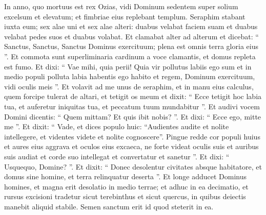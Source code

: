 \begin{biblechapter}
\begin{biblechapter}
\begin{biblechapter}
\begin{biblechapter}
\begin{biblechapter}
\begin{biblechapter}
\verse In anno, quo mortuus est rex Ozias, vidi Dominum sedentem super solium excelsum et elevatum; et fimbriae eius replebant templum. 
\verse Seraphim stabant iuxta eum; sex alae uni et sex alae alteri: duabus velabat faciem suam et duabus velabat pedes suos et duabus volabat. 
\verse Et clamabat alter ad alterum et dicebat:
 “ Sanctus, Sanctus, Sanctus Dominus exercituum;
 plena est omnis terra gloria eius ”.
 \verse Et commota sunt superliminaria cardinum a voce clamantis, et domus repleta est fumo.
 \verse Et dixi:
 “ Vae mihi, quia perii!
 Quia vir pollutus labiis ego sum
 et in medio populi polluta labia habentis ego habito
 et regem, Dominum exercituum, vidi oculis meis ”.
 \verse Et volavit ad me unus de seraphim, et in manu eius calculus, quem forcipe tulerat de altari, 
\verse et tetigit os meum et dixit:
 “ Ecce tetigit hoc labia tua,
 et auferetur iniquitas tua,
 et peccatum tuum mundabitur ”.
 \verse Et audivi vocem Domini dicentis: “ Quem mittam? Et quis ibit nobis? ”. Et dixi: “ Ecce ego, mitte me ”. 
\verse Et dixit: “ Vade, et dices populo huic:
 “Audientes audite et nolite intellegere,
 et videntes videte et nolite cognoscere”.
 \verse Pingue redde cor populi huius
 et aures eius aggrava
 et oculos eius excaeca,
 ne forte videat oculis suis
 et auribus suis audiat
 et corde suo intellegat et convertatur
 et sanetur ”.
 \verse Et dixi: “ Usquequo, Domine? ”. Et dixit:
 “ Donec desolentur
 civitates absque habitatore,
 et domus sine homine,
 et terra relinquatur deserta ”.
 \verse Et longe adducet Dominus homines,
 et magna erit desolatio in medio terrae;
 \verse et adhuc in ea decimatio,
 et rursus excisioni tradetur
 sicut terebinthus et sicut quercus,
 in quibus deiectis manebit aliquid stabile.
 Semen sanctum erit id quod steterit in ea.
 

\end{biblechapter}
\end{biblechapter}
\end{biblechapter}
\end{biblechapter}
\end{biblechapter}
\end{biblechapter}

